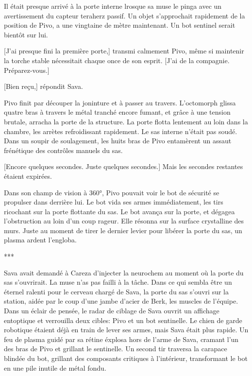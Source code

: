 Il était presque arrivé à la porte interne lrosque sa muse le pinga avec un avertissement du capteur teraherz passif. Un objet s'approchait rapidement de la position de Pivo, a une vingtaine de mètre maintenant. Un bot sentinel serait bientôt sur lui. 

[J'ai presque fini la première porte,] transmi calmement Pivo, même si maintenir la torche stable nécessitait chaque once de son esprit. [J'ai de la compagnie. Préparez-vous.] 

[Bien reçu,] répondit Sava. 

Pivo finit par découper la joninture et à passer au travers. L'octomorph glissa quatre bras à travers le métal tranché encore fumant, et grâce à une tension brutale, arracha la porte de la structure. La porte flotta lentement au loin dans la chambre, les arrètes refroidissant rapidement. Le sas interne n'était pas soudé. Dans un soupir de soulagement, les huits bras de Pivo entamèrent un assaut frénétique des contrôles manuels du sas. 

[Encore quelques secondes. Juste quelques secondes.] Mais les secondes restantes étaient expirées. 

Dans son champ de vision à 360°, Pivo pouvait voir le bot de sécurité se propulser dans derrière lui. Le bot vida ses armes immédiatement, les tirs ricochant sur la porte flottante du sas. Le bot avança sur la porte, et dégagea l'obstruction au loin d'un coup rageur. Elle résonna sur la surface crystalline des murs. Juste au moment de tirer le dernier levier pour libérer la porte du sas, un plasma ardent l'engloba. 

\begin{center} *** \end{center} 

Sava avait demandé à Careza d'injecter la neurochem au moment où la porte du sas s'ouvrirait. La muse n'as pas failli à la tâche. Dans ce qui sembla être un éternel ralenti pour le cerveau chargé de Sava, la porte du sas s'ouvri sur la station, aidée par le coup d'une jambe d'acier de Berk, les muscles de l'équipe. Dans un éclair de pensée, le radar de ciblage de Sava ouvrit un affichage entoptique et verrouilla deux cibles: Pivo et un bot sentinelle. Le chien de garde robotique étaient déjà en train de lever ses armes, mais Sava était plus rapide. Un feu de plasma guidé par sa rétine éxplosa hors de l'arme de Sava, cramant l'un des bras de Pivo et grillant le sentinelle. Un second tir traversa la carapace blindée du bot, grillant des composants critiques à l'intérieur, transformant le bot en une pile inutile de métal fondu. 


